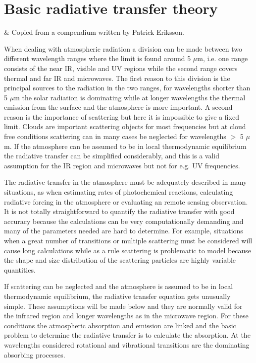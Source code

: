 \chapter{Basic radiative transfer theory}
 \label{sec:rte_theory}


 & Copied from a compendium written by Patrick Eriksson.\\
\stophistory


 When dealing with atmospheric radiation a division can be made
 between two different wavelength ranges where the limit is found
 around 5 $\mu$m, i.e. one range consists of the near IR, visible and UV
 regions while the second range covers thermal and far IR and
 microwaves. The first reason to this division is the principal
 sources to the radiation in the two ranges, for wavelengths shorter
 than 5 $\mu$m the solar radiation is dominating while at longer
 wavelengths the thermal emission from the surface and the atmosphere
 is more important. A second reason is the importance of scattering
 but here it is impossible to give a fixed limit. Clouds are important
 scattering objects for most frequencies but at cloud free conditions
 scattering can in many cases be neglected for wavelengths $>$ 5 $\mu$m. If
 the atmosphere can be assumed to be in local thermodynamic
 equilibrium the radiative transfer can be simplified considerably,
 and this is a valid assumption for the IR region and microwaves but
 not for e.g. UV frequencies.
 
 The radiative transfer in the atmosphere must be adequately described
 in many situations, as when estimating rates of photochemical
 reactions, calculating radiative forcing in the atmosphere or
 evaluating an remote sensing observation. It is not totally
 straightforward to quantify the radiative transfer with good accuracy
 because the calculations can be very computationally demanding and
 many of the parameters needed are hard to determine. For example,
 situations when a great number of transitions or multiple scattering
 must be considered will cause long calculations while as a rule
 scattering is problematic to model because the shape and size
 distribution of the scattering particles are highly variable
 quantities.  
 
 If scattering can be neglected and the atmosphere is assumed to be in
 local thermodynamic equilibrium, the radiative transfer equation gets
 unusually simple. These assumptions will be made below and
 they are normally valid for the infrared region and longer
 wavelengths as in the microwave region. For these conditions the
 atmospheric absorption and emission are linked and the basic problem
 to determine the radiative transfer is to calculate the absorption.
 At the wavelengths considered rotational and vibrational transitions
 are the dominating absorbing processes.


